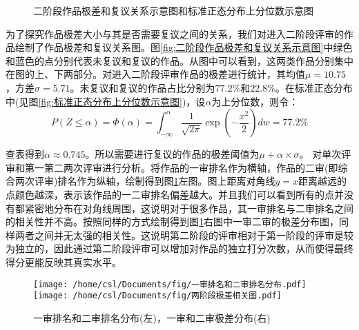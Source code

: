 \documentclass[bwprint]{gmcmthesis}
\begin{document}
		\begin{figure}[t]
	\centering
{}
	\caption{二阶段作品极差和复议关系示意图和标准正态分布上分位数示意图}
\end{figure}
为了探究作品极差大小与其是否需要复议之间的关系，我们对进入二阶段评审的作品绘制了作品极差和复议关系图。图\ref{fig:二阶段作品极差和复议关系示意图}中绿色和蓝色的点分别代表未复议和复议的作品。从图中可以看到，这两类作品分别集中在图的上、下两部分。对进入二阶段评审作品的极差进行统计，其均值$\mu=10.75$，方差$\sigma=5.71$。未复议和复议的作品占比分别为$77.2\%$和$22.8\%$。在标准正态分布中(见图\ref{fig:标准正态分布上分位数示意图})，设$\alpha$为上分位数，则令：
\begin{equation}
	P(Z\le \alpha)=\Phi(\alpha)=\int_{-\infty}^{\alpha}\frac{1}{\sqrt{2\pi}}\exp{\left( -\frac{x^2}{2}\right) }dw=77.2\%
\end{equation}
\par

查表得到$\alpha\approx 0.745$。所以需要进行复议的作品的极差阈值为$\mu+\alpha\times\sigma$。
对单次评审和第一第二两次评审进行分析。将作品的一审排名作为横轴，作品的二审(即综合两次评审)排名作为纵轴，绘制得到图\ref{fig:一审排名和二审排名分布(左)，一审和二审极差分布(右)}左图。图上距离对角线$y=x$距离越远的点颜色越深，表示该作品的一二审排名偏差越大。并且我们可以看到所有的点并没有都紧密地分布在对角线周围，这说明对于很多作品，其一审排名与二审排名之间的相关性并不高。按照同样的方式绘制得到图\ref{fig:一审排名和二审排名分布(左)，一审和二审极差分布(右)}右图中一审二审的极差分布图，同样两者之间并无太强的相关性。这说明第二阶段的评审相对于第一阶段的评审是较为独立的，因此通过第二阶段评审可以增加对作品的独立打分次数，从而使得最终得分更能反映其真实水平。

\begin{figure}[h]
	\centering
	\texttt{[image: /home/csl/Documents/fig/一审排名和二审排名分布.pdf]}
	\texttt{[image: /home/csl/Documents/fig/两阶段极差相关图.pdf]}
	\caption{\normf 一审排名和二审排名分布(左)，一审和二审极差分布(右)} 
	\label{fig:一审排名和二审排名分布(左)，一审和二审极差分布(右)}
\end{figure}
\end{document}
